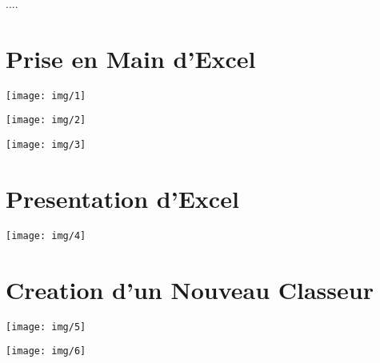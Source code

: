 \documentclass[a4paper, 12pt, twoside,openright]{report}
\begin{document}
	\let\cleardoublepage\clearpage
\pagedegarde
	\clearpage
		\begin{minipage}[r]{0.2\columnwidth}
			....
		\end{minipage}
		\begin{minipage}[r]{0.6\columnwidth}
			\vspace{6mm}
			\setcounter{tocdepth}{1}	%
			\dominitoc						%
			\tableofcontents
		\end{minipage} 
		
		\clearpage
	\setcounter{mtc}{3}	%
		
	\part{Prise en Main d'Excel} 
	\begin{landscape} 		
		\texttt{[image: img/1]}
	\end{landscape}
	\begin{landscape} 		
		\texttt{[image: img/2]}
	\end{landscape}
\begin{landscape} 		
	\texttt{[image: img/3]}
\end{landscape}

\part{Presentation d'Excel}

\begin{landscape} 		
	\texttt{[image: img/4]}
\end{landscape}

\part{Creation d'un Nouveau Classeur}
\begin{landscape} 		
	\texttt{[image: img/5]}
\end{landscape}
\begin{landscape} 		
	\texttt{[image: img/6]}
\end{landscape}
\end{document}
